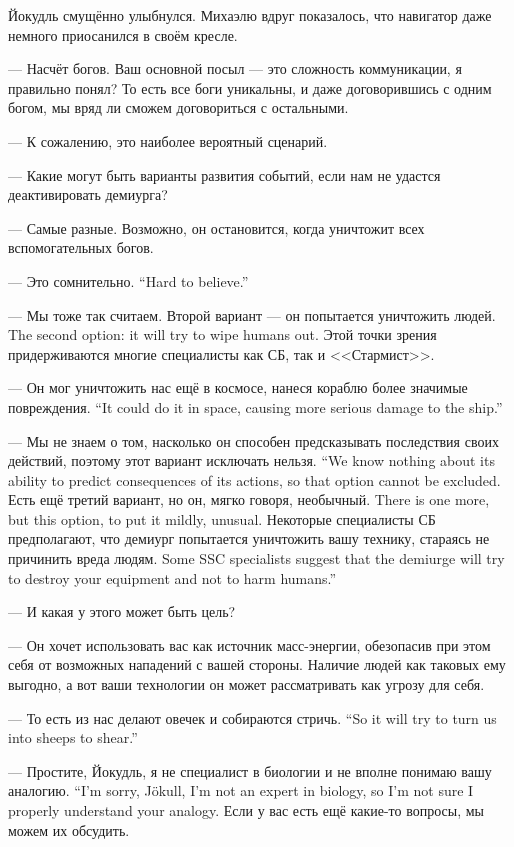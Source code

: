 Йокудль смущённо улыбнулся.
Михаэлю вдруг показалось, что навигатор даже немного приосанился в своём кресле.

--- Насчёт богов.
Ваш основной посыл --- это сложность коммуникации, я правильно понял?
То есть все боги уникальны, и даже договорившись с одним богом, мы вряд ли сможем договориться с остальными.

--- К сожалению, это наиболее вероятный сценарий.

--- Какие могут быть варианты развития событий, если нам не удастся деактивировать демиурга?

--- Самые разные.
Возможно, он остановится, когда уничтожит всех вспомогательных богов.

{--- Это сомнительно.}
{``Hard to believe.''}

--- Мы тоже так считаем.
{Второй вариант --- он попытается уничтожить людей.}
{The second option: it will try to wipe humans out.}
Этой точки зрения придерживаются многие специалисты как СБ, так и <<Стармист>>.

{--- Он мог уничтожить нас ещё в космосе, нанеся кораблю более значимые повреждения.}
{``It could do it in space, causing more serious damage to the ship.''}

{--- Мы не знаем о том, насколько он способен предсказывать последствия своих действий, поэтому этот вариант исключать нельзя.}
{``We know nothing about its ability to predict consequences of its actions, so that option cannot be excluded.}
{Есть ещё третий вариант, но он, мягко говоря, необычный.}
{There is one more, but this option, to put it mildly, unusual.}
{Некоторые специалисты СБ предполагают, что демиург попытается уничтожить вашу технику, стараясь не причинить вреда людям.}
{Some SSC specialists suggest that the demiurge will try to destroy your equipment and not to harm humans.''}

--- И какая у этого может быть цель?

--- Он хочет использовать вас как источник масс-энергии, обезопасив при этом себя от возможных нападений с вашей стороны.
Наличие людей как таковых ему выгодно, а вот ваши технологии он может рассматривать как угрозу для себя.

{--- То есть из нас делают овечек и собираются стричь.}
{``So it will try to turn us into sheeps to shear.''}

{--- Простите, Йокудль, я не специалист в биологии и не вполне понимаю вашу аналогию.}
{``I'm sorry, Jökull, I'm not an expert in biology, so I'm not sure I properly understand your analogy.}
Если у вас есть ещё какие-то вопросы, мы можем их обсудить.

